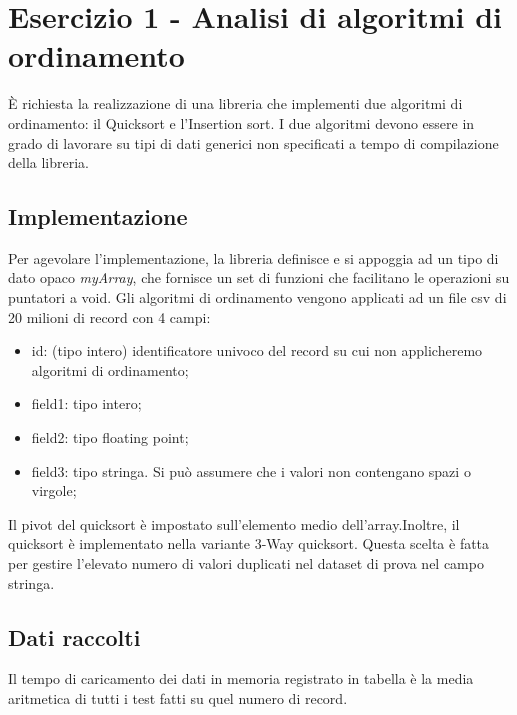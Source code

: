 \section{Esercizio 1 - Analisi di algoritmi di ordinamento} 
È richiesta la realizzazione di una libreria che implementi due algoritmi di ordinamento: il Quicksort e l'Insertion sort. I due algoritmi devono essere in grado di lavorare su tipi di dati generici non specificati a tempo di compilazione della libreria.

\subsection{Implementazione}
 Per agevolare l'implementazione, la libreria definisce e si appoggia ad un tipo di dato opaco \textit{myArray}, che fornisce un set di funzioni che facilitano le operazioni su puntatori a void.\newline
Gli algoritmi di ordinamento vengono applicati ad un file csv di 20 milioni di record con 4 campi:
\begin{itemize}
    \item id: (tipo intero) identificatore univoco del record su cui non applicheremo algoritmi di ordinamento;
    \item field1: tipo intero;  
    \item field2: tipo floating point;
    \item field3: tipo stringa. Si può assumere che i valori non contengano spazi o virgole;
\end{itemize}
Il pivot del quicksort è impostato sull'elemento medio dell'array.\newline Inoltre, il quicksort è implementato nella variante 3-Way quicksort. Questa scelta è fatta per gestire l'elevato numero di valori duplicati nel dataset di prova nel campo stringa.

\subsection{Dati raccolti}
Il tempo di caricamento dei dati in memoria registrato in tabella è la media aritmetica di tutti i test fatti su quel numero di record.

